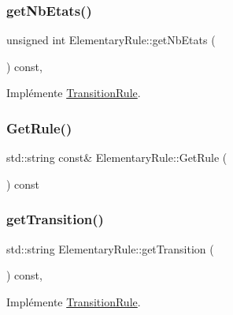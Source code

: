 \subsubsection{\texorpdfstring{get\+Nb\+Etats()}{getNbEtats()}}
{\footnotesize\ttfamily unsigned int Elementary\+Rule\+::get\+Nb\+Etats (\begin{DoxyParamCaption}{ }\end{DoxyParamCaption}) const\hspace{0.3cm}{\ttfamily [inline]}, {\ttfamily [virtual]}}



Implémente \mbox{\hyperlink{class_transition_rule_ad5bbcc6ef292bb079d8980f00d011a90}{Transition\+Rule}}.

\mbox{\label{class_elementary_rule_aa613ebf61f261d5e4d36d1133a975567}} 
\subsubsection{\texorpdfstring{Get\+Rule()}{GetRule()}}
{\footnotesize\ttfamily std\+::string const\& Elementary\+Rule\+::\+Get\+Rule (\begin{DoxyParamCaption}{ }\end{DoxyParamCaption}) const\hspace{0.3cm}{\ttfamily [inline]}}

\mbox{\label{class_elementary_rule_aa214ba2de95a61390947a550a39937bb}} 
\subsubsection{\texorpdfstring{get\+Transition()}{getTransition()}}
{\footnotesize\ttfamily std\+::string Elementary\+Rule\+::get\+Transition (\begin{DoxyParamCaption}{ }\end{DoxyParamCaption}) const\hspace{0.3cm}{\ttfamily [override]}, {\ttfamily [virtual]}}



Implémente \mbox{\hyperlink{class_transition_rule_af537bee6cca486c754ee94855242328c}{Transition\+Rule}}.

